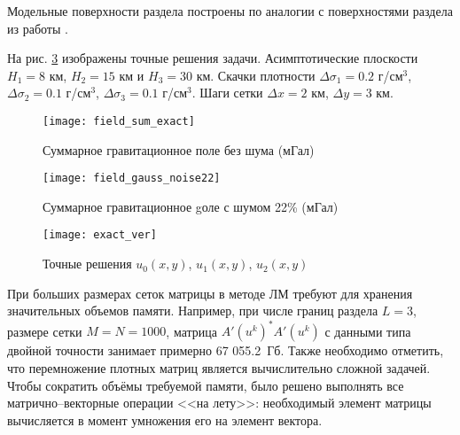 Модельные поверхности раздела построены по аналогии с поверхностями раздела из работы \cite{MarAkiMis2016}.

На рис. \ref{fig:exact_ver} изображены точные решения задачи. Асимптотические плоскости $H_1=8$ км, $H_2=15$ км и $H_3=30$ км. Скачки плотности $\Delta\sigma_1=0.2$ г/см$^3$, $\Delta\sigma_2=0.1$ г/см$^3$, $\Delta\sigma_3=0.1$ г/см$^3$. Шаги сетки $\Delta x=2$ км, $\Delta y=3$ км.

\begin{figure}[H]
	\centering
	\texttt{[image: field\_sum\_exact]}
	\caption{Суммарное гравитационное поле без шума (мГал)}
	\label{fig:field_sum_exact}
\end{figure}
\begin{figure}[H]
	\centering
	\texttt{[image: field\_gauss\_noise22]}
	\caption{Суммарное гравитационное gоле с шумом 22\% (мГал)}
	\label{fig:field_gauss_noise22}
\end{figure}


\begin{figure}[H]
	\centering
	\texttt{[image: exact\_ver]}
	\caption{Точные решения $u_0(x,y)$, $u_1(x,y)$, $u_2(x,y)$}
	\label{fig:exact_ver}
\end{figure}

При больших размерах сеток матрицы в методе ЛМ требуют для хранения значительных объемов памяти. Например, при числе границ раздела $L=3$, размере сетки $M=N=1000$, матрица $A'(u^k)^*A'(u^k)$ с данными типа двойной точности занимает примерно  67 055.2~Гб. Также необходимо отметить, что перемножение плотных матриц является вычислительно сложной задачей. Чтобы сократить объёмы требуемой памяти, было решено выполнять все матрично--векторные операции <<на лету>>: необходимый элемент матрицы вычисляется в момент умножения его на элемент вектора.

